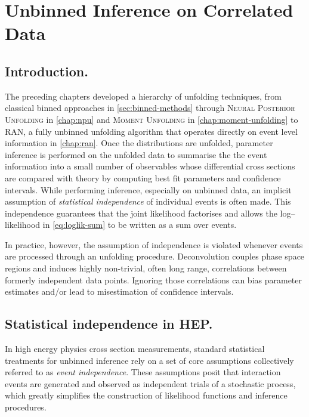 \chapter{Unbinned Inference on Correlated Data}
\label{chap:unbinned_correlations}
\chapterminitoc
\section{Introduction.}
    The preceding chapters developed a hierarchy of unfolding techniques, from classical binned approaches in \cref{sec:binned-methods} through \textsc{Neural Posterior Unfolding} in \cref{chap:npu} and \textsc{Moment Unfolding} in \cref{chap:moment-unfolding} to RAN, a fully unbinned unfolding algorithm that operates directly on event level information in \cref{chap:ran}.
    Once the distributions are unfolded, parameter inference is performed on the unfolded data to summarise the the event information into a small number of observables whose differential cross sections are compared with theory by computing best fit parameters and confidence intervals.
    While performing inference, especially on unbinned data, an implicit assumption of \emph{statistical independence} of individual events is often made.
    This independence guarantees that the joint likelihood factorises and allows the log--likelihood in \cref{eq:loglik-sum} to be written as a sum over events.
    
    In practice, however, the assumption of independence is violated whenever events are processed through an unfolding procedure.
    Deconvolution couples phase space regions and induces highly non-trivial, often long range, correlations between formerly independent data points.
    Ignoring those correlations can bias parameter estimates and/or lead to misestimation of confidence intervals.
\section{Statistical independence in HEP.}
\label{sec:independence-assumptions}
\sectionminitoc
\begin{definition}
    In high energy physics cross section measurements, standard statistical treatments for unbinned inference rely on a set of core assumptions collectively referred to as \emph{event independence}. 
    These assumptions posit that interaction events are generated and observed as independent trials of a stochastic process, which greatly simplifies the construction of likelihood functions and inference procedures.
\end{definition}
    
